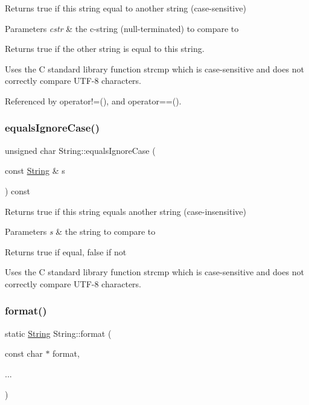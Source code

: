 Returns true if this string equal to another string (case-\/sensitive) 


\begin{DoxyParams}{Parameters}
{\em cstr} & the c-\/string (null-\/terminated) to compare to\\
\hline
\end{DoxyParams}
\begin{DoxyReturn}{Returns}
true if the other string is equal to this string.
\end{DoxyReturn}
Uses the C standard library function strcmp which is case-\/sensitive and does not correctly compare U\+T\+F-\/8 characters. 

Referenced by operator!=(), and operator==().

\mbox{\label{class_string_a3b8832687edda189ae43632d70157b94}} 
\subsubsection{\texorpdfstring{equals\+Ignore\+Case()}{equalsIgnoreCase()}}
{\footnotesize\ttfamily unsigned char String\+::equals\+Ignore\+Case (\begin{DoxyParamCaption}\item[{const \hyperlink{class_string}{String} \&}]{s }\end{DoxyParamCaption}) const}



Returns true if this string equals another string (case-\/insensitive) 


\begin{DoxyParams}{Parameters}
{\em s} & the string to compare to\\
\hline
\end{DoxyParams}
\begin{DoxyReturn}{Returns}
true if equal, false if not
\end{DoxyReturn}
Uses the C standard library function strcmp which is case-\/sensitive and does not correctly compare U\+T\+F-\/8 characters. \mbox{\label{class_string_a735dfb188ddcaaddbcb42cc3a9e59afc}} 
\subsubsection{\texorpdfstring{format()}{format()}}
{\footnotesize\ttfamily static \hyperlink{class_string}{String} String\+::format (\begin{DoxyParamCaption}\item[{const char $\ast$}]{format,  }\item[{}]{... }\end{DoxyParamCaption})\hspace{0.3cm}{\ttfamily [static]}}




